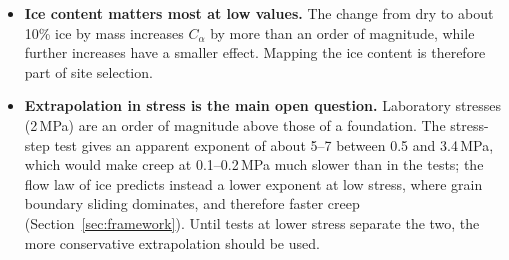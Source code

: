\begin{itemize}
    \item \textbf{Ice content matters most at low values.} The change from dry to about 10\% ice by mass increases $C_\alpha$ by more than an order of magnitude, while further increases have a smaller effect. Mapping the ice content is therefore part of site selection.
    \item \textbf{Extrapolation in stress is the main open question.} Laboratory stresses (2\,MPa) are an order of magnitude above those of a foundation. The stress-step test gives an apparent exponent of about 5--7 between 0.5 and 3.4\,MPa, which would make creep at 0.1--0.2\,MPa much slower than in the tests; the flow law of ice predicts instead a lower exponent at low stress, where grain boundary sliding dominates, and therefore faster creep (Section~\ref{sec:framework}). Until tests at lower stress separate the two, the more conservative extrapolation should be used.
\end{itemize}
